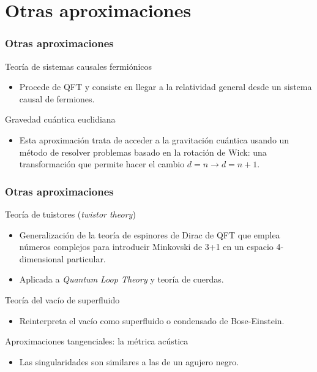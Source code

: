 \documentclass{beamer}
\begin{document}
\section{Otras aproximaciones}
\begin{frame}
\frametitle{Otras aproximaciones}
\begin{block}{Teoría de sistemas causales fermiónicos}
  \begin{itemize}
    \item Procede de QFT y consiste en llegar a la relatividad general desde un sistema causal de fermiones.
  \end{itemize}
\end{block}
\begin{block}{Gravedad cuántica euclidiana}
  \begin{itemize}
    \item Esta aproximación trata de acceder a la gravitación cuántica usando un método de resolver problemas basado en la rotación de Wick: una transformación que permite hacer el cambio $d=n \rightarrow d=n+1$.
  \end{itemize}
\end{block}
\end{frame}
%
%
\begin{frame}
\frametitle{Otras aproximaciones}
\begin{block}{Teoría de tuistores (\textit{twistor theory})}
  \begin{itemize}
    \item Generalización de la teoría de espinores de Dirac de QFT que emplea números complejos para introducir Minkovski de 3+1 en un espacio 4-dimensional particular.
    \item Aplicada a \textit{Quantum Loop Theory} y teoría de cuerdas.
  \end{itemize}
\end{block}
\begin{block}{Teoría del vacío de superfluido}
  \begin{itemize}
    \item Reinterpreta el vacío como superfluido o condensado de Bose-Einstein.
  \end{itemize}
\end{block}
\begin{block}{Aproximaciones tangenciales: la métrica acústica}
  \begin{itemize}
    \item Las singularidades son similares a las de un agujero negro.
  \end{itemize}
\end{block}
\end{frame}
%
%
\end{document}

